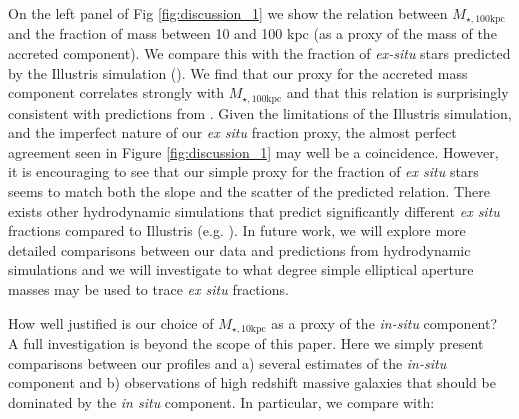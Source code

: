 \documentclass[a4paper,fleqn,usenatbib]{mnras}
\def\rbcg{\texttt{cenHighMh}}
\def\nbcg{\texttt{cenLowMh}}
\def\mstar{{$M_{\star}$}}
\def\mhalo{{$M_{\mathrm{200b}}$}}
\def\logms{{$\log (M_{\star}/M_{\odot})$}}
\def\minn{{$M_{\star,10\mathrm{kpc}}$}}
\def\mtot{{$M_{\star,100\mathrm{kpc}}$}}
\def\mden{{$\mu_{\star}$}}
\begin{document}
    On the left panel of Fig \ref{fig:discussion_1} we show the relation between 
    \mtot{} and the fraction of mass between 10 and 100 kpc (as a proxy of the mass of 
    the accreted component).
    We compare this with the fraction of \textit{ex-situ} stars predicted by the 
    Illustris simulation (\citealt{RodriguezGomez2016}).  
    We find that our proxy for the accreted mass component correlates strongly with  
    \mtot{} and that this relation is surprisingly consistent with predictions from
    \citet{RodriguezGomez2016}.  
    Given the limitations of the Illustris simulation, and the imperfect nature of 
    our \textit{ex situ} fraction proxy, the almost perfect agreement seen in 
    Figure \ref{fig:discussion_1} may well be a coincidence.  
    However, it is encouraging to see that our simple proxy for the fraction of 
    \textit{ex situ} stars seems to match both the slope and the scatter of the 
    predicted relation.  
    There exists other hydrodynamic simulations that predict significantly different 
    \textit{ex situ} fractions compared to Illustris (e.g. \citealt{Lackner2012, 
    Qu2017}). 
    In future work, we will explore more detailed comparisons between our data and
    predictions from hydrodynamic simulations and we will investigate to what degree 
    simple elliptical aperture masses may be used to trace \textit{ex situ} fractions. 
    
   
    How well justified is our choice of \minn{} as a proxy of the \textit{in-situ} 
    component?  
    A full investigation is beyond the scope of this paper. 
    Here we simply present comparisons between our profiles and  
    a) several estimates of the \textit{in-situ} component and 
    b) observations of high redshift massive galaxies that should be dominated by 
    the \textit{in situ} component.  
    In particular, we compare with:
  
\end{document}
